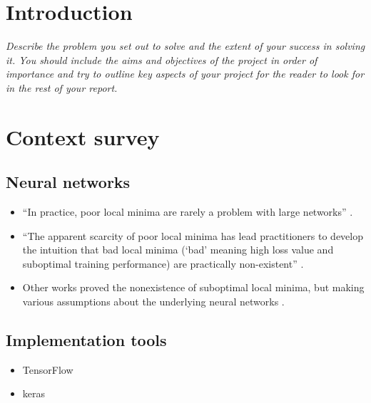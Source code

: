 \chapter{Introduction}
\textit{Describe the problem you set out to solve and the
extent of your success in solving it. You should include
the aims and objectives of the project in order of
importance and try to outline key aspects of your
project for the reader to look for in the rest of your
report.}
\todo

\chapter{Context survey}
\section{Neural networks}
\begin{itemize}
    \item ``In practice, poor local minima are rarely a problem with large networks'' \cite{lecun2015}.
    \item ``The apparent scarcity of poor local minima has lead practitioners to develop the intuition that bad local minima (`bad' meaning high loss value and suboptimal training performance) are practically non-existent'' \cite{goldblum2019}.
    \item Other works proved the nonexistence of suboptimal local minima, but making various assumptions about the underlying neural networks \cite{kawaguchi2016,nguyen2018,laurent2018}.
\end{itemize}


\todo
\section{Implementation tools}
\begin{itemize}
    \item TensorFlow
    \item keras
\end{itemize}
\todo

